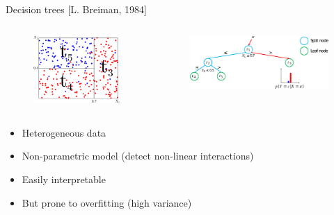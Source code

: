 \documentclass{beamer}
\begin{document}

\begin{frame}{Decision trees [L. Breiman, 1984]}
\begin{columns}
\begin{column}{0.3\textwidth}
\begin{figure}
\includegraphics[width=\textwidth]{./figures/tree-partition-d.pdf}
\end{figure}
\end{column}
\begin{column}{0.7\textwidth}
\begin{figure}
\includegraphics[width=\textwidth]{./figures/tree-simple.pdf}
\end{figure}
\end{column}
\end{columns}

\vspace{0.5cm}

\begin{itemize}
\item {\color{blue}Heterogeneous} data
\item {\color{blue}Non-parametric} model (detect non-linear interactions)
\item Easily {\color{blue}interpretable}
\item But {\color{red} prone to overfitting} (high variance)
\end{itemize}


\end{frame}
\end{document}
